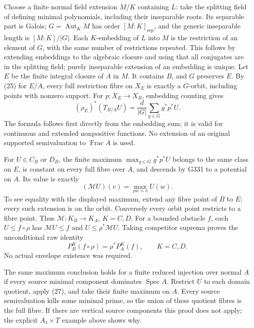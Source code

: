 Choose a finite normal field extension \(M/K\) containing \(L\):
take the splitting field of defining minimal polynomials,
including their inseparable roots. Its separable part is
Galois; \(G=\operatorname{Aut}_K M\) has order
\([M:K]_{\mathrm{sep}}\), and the generic inseparable length is
\([M:K]/|G|\). Each \(K\)-embedding of \(L\) into \(M\) is
the restriction of an element of \(G\), with the same number
of restrictions repeated. This follows by extending embeddings
to the algebraic closure and using that all conjugates are in
the splitting field; purely inseparable extension of an
embedding is unique.
Let \(E\) be the finite integral closure of \(A\) in \(M\).
It contains \(B\), and \(G\) preserves \(E\).
By (25) for \(E/A\), every full restriction fibre on \(X_E\)
is exactly a \(G\)-orbit, including points with nonzero support.
For \(p:X_E\to X_B\), embedding counting gives
\[
 (\rho_E)^*(T_{B/A}U)
       =\frac d{|G|}\sum_{g\in G}g^*p^*U .                   \tag{26}
\]
The formula follows first directly from the embedding sum;
it is valid for continuous and extended nonpositive functions.
No extension of an original supported semivaluation to
\(\operatorname{Frac}A\) is used.

For \(U\in C_B\) or \(D_B\), the finite maximum
\(\max_{g\in G}g^*p^*U\) belongs to the same class on \(E\),
is constant on every full fibre over \(A\), and descends by
G331 to a potential on \(A\). Its value is exactly
\[
 (\mathcal M U)(v)=\max_{\rho w=v}U(w).                        \tag{27}
\]
To see equality with the displayed maximum, extend any fibre
point of \(B\) to \(E\); every such extension is on the orbit.
Conversely every orbit point restricts to a fibre point.
Thus \(\mathcal M:K_B\to K_A\), \(K=C,D\).
For a bounded obstacle \(f\), each \(U\leq f\circ\rho\)
has \(\mathcal M U\leq f\) and \(U\leq\rho^*\mathcal M U\).
Taking competitor suprema proves the unconditional raw identity
\[
 P_B^K(f\circ\rho)=\rho^*P_A^K(f),\qquad K=C,D.                \tag{28}
\]
No actual envelope existence was required.

The same maximum conclusion holds for a finite reduced injection
over normal \(A\) if every source minimal component dominates
\(\operatorname{Spec}A\). Restrict \(U\) to each domain quotient,
apply (27), and take their finite maximum on \(A\).
Every source semivaluation kills some minimal prime, so the
union of these quotient fibres is the full fibre.
If there are vertical source components this proof does not
apply; the explicit \(A_1\times T\) example above shows why.

